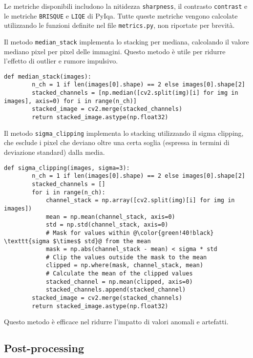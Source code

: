 Le metriche disponibili includono la nitidezza \texttt{sharpness}, il contrasto \texttt{contrast} e le metriche \texttt{BRISQUE} e \texttt{LIQE} di PyIqa. Tutte queste metriche vengono calcolate utilizzando le funzioni definite nel file \texttt{metrics.py}, non riportate per brevità.

Il metodo \texttt{median\_stack} implementa lo stacking per mediana, calcolando il valore mediano pixel per pixel delle immagini. Questo metodo è utile per ridurre l'effetto di outlier e rumore impulsivo.

\begin{lstlisting}[label={lst:median_stack}]
    def median_stack(images):
        n_ch = 1 if len(images[0].shape) == 2 else images[0].shape[2]
        stacked_channels = [np.median([cv2.split(img)[i] for img in images], axis=0) for i in range(n_ch)]
        stacked_image = cv2.merge(stacked_channels)
        return stacked_image.astype(np.float32)
\end{lstlisting}

Il metodo \texttt{sigma\_clipping} implementa lo stacking utilizzando il sigma clipping, che esclude i pixel che deviano oltre una certa soglia (espressa in termini di deviazione standard) dalla media.

\begin{lstlisting}[label={lst:sigma_clipping}]
    def sigma_clipping(images, sigma=3):
        n_ch = 1 if len(images[0].shape) == 2 else images[0].shape[2]
        stacked_channels = []
        for i in range(n_ch):
            channel_stack = np.array([cv2.split(img)[i] for img in images])
            mean = np.mean(channel_stack, axis=0)
            std = np.std(channel_stack, axis=0)
            # Mask for values within @\color{green!40!black} \texttt{sigma $\times$ std}@ from the mean
            mask = np.abs(channel_stack - mean) < sigma * std
            # Clip the values outside the mask to the mean
            clipped = np.where(mask, channel_stack, mean)
            # Calculate the mean of the clipped values
            stacked_channel = np.mean(clipped, axis=0)
            stacked_channels.append(stacked_channel)
        stacked_image = cv2.merge(stacked_channels)
        return stacked_image.astype(np.float32)
\end{lstlisting}

Questo metodo è efficace nel ridurre l'impatto di valori anomali e artefatti.

\subsection{Post-processing} \label{subsec:postprocessing_impl}

